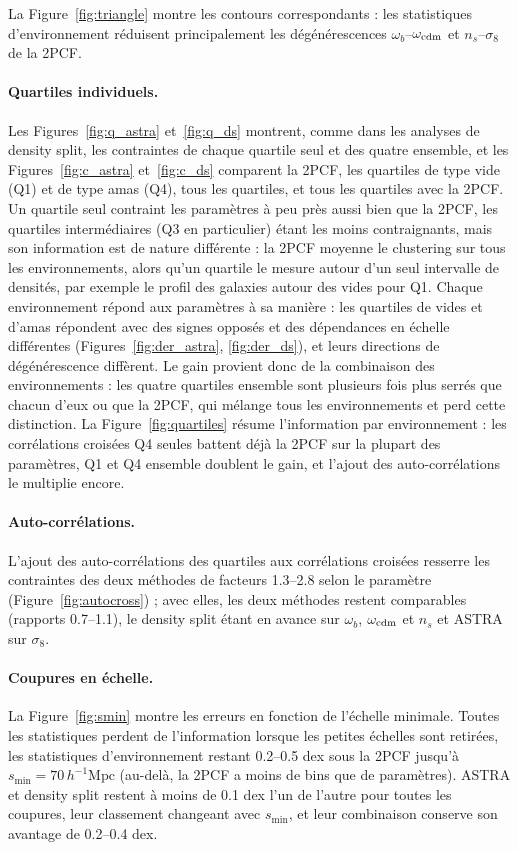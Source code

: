 \documentclass[11pt,twocolumn]{article}
\newcommand{\Mpch}{\,h^{-1}\mathrm{Mpc}}
\begin{document}
La Figure~\ref{fig:triangle} montre les contours correspondants : les statistiques d'environnement réduisent principalement les dégénérescences $\omega_b$--$\omega_{\rm cdm}$ et $n_s$--$\sigma_8$ de la 2PCF.

\paragraph{Quartiles individuels.} Les Figures~\ref{fig:q_astra} et~\ref{fig:q_ds} montrent, comme dans les analyses de density split, les contraintes de chaque quartile seul et des quatre ensemble, et les Figures~\ref{fig:c_astra} et~\ref{fig:c_ds} comparent la 2PCF, les quartiles de type vide (Q1) et de type amas (Q4), tous les quartiles, et tous les quartiles avec la 2PCF. Un quartile seul contraint les paramètres à peu près aussi bien que la 2PCF, les quartiles intermédiaires (Q3 en particulier) étant les moins contraignants, mais son information est de nature différente : la 2PCF moyenne le clustering sur tous les environnements, alors qu'un quartile le mesure autour d'un seul intervalle de densités, par exemple le profil des galaxies autour des vides pour Q1. Chaque environnement répond aux paramètres à sa manière : les quartiles de vides et d'amas répondent avec des signes opposés et des dépendances en échelle différentes (Figures~\ref{fig:der_astra}, \ref{fig:der_ds}), et leurs directions de dégénérescence diffèrent. Le gain provient donc de la combinaison des environnements : les quatre quartiles ensemble sont plusieurs fois plus serrés que chacun d'eux ou que la 2PCF, qui mélange tous les environnements et perd cette distinction. La Figure~\ref{fig:quartiles} résume l'information par environnement : les corrélations croisées Q4 seules battent déjà la 2PCF sur la plupart des paramètres, Q1 et Q4 ensemble doublent le gain, et l'ajout des auto-corrélations le multiplie encore.

\paragraph{Auto-corrélations.} L'ajout des auto-corrélations des quartiles aux corrélations croisées resserre les contraintes des deux méthodes de facteurs 1.3--2.8 selon le paramètre (Figure~\ref{fig:autocross}) ; avec elles, les deux méthodes restent comparables (rapports 0.7--1.1), le density split étant en avance sur $\omega_b$, $\omega_{\rm cdm}$ et $n_s$ et ASTRA sur $\sigma_8$.

\paragraph{Coupures en échelle.} La Figure~\ref{fig:smin} montre les erreurs en fonction de l'échelle minimale. Toutes les statistiques perdent de l'information lorsque les petites échelles sont retirées, les statistiques d'environnement restant 0.2--0.5 dex sous la 2PCF jusqu'à $s_{\min}=70\Mpch$ (au-delà, la 2PCF a moins de bins que de paramètres). ASTRA et density split restent à moins de 0.1 dex l'un de l'autre pour toutes les coupures, leur classement changeant avec $s_{\min}$, et leur combinaison conserve son avantage de 0.2--0.4 dex.
\end{document}
